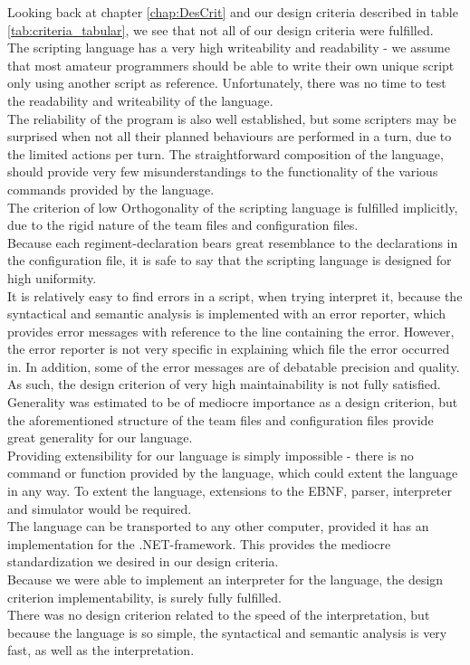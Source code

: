 	Looking back at chapter \ref{chap:DesCrit} and our design criteria described in table \ref{tab:criteria_tabular}, we see that not all of our design criteria were fulfilled. \\
	The scripting language has a very high writeability and readability - we assume that most amateur programmers should be able to write their own unique script only using another script as reference. Unfortunately, there was no time to test the readability and writeability of the language. \\
	The reliability of the program is also well established, but some scripters may be surprised when not all their planned behaviours are performed in a turn, due to the limited actions per turn. The straightforward composition of the language, should provide very few misunderstandings to the functionality of the various commands provided by the language.\\
	The criterion of low Orthogonality of the scripting language is fulfilled implicitly, due to the rigid nature of the team files and configuration files.\\ 
	Because each regiment-declaration bears great resemblance to the declarations in the configuration file, it is safe to say that the scripting language is designed for high uniformity. \\
	It is relatively easy to find errors in a script, when trying interpret it, because the syntactical and semantic analysis is implemented with an error reporter, which provides error messages with reference to the line containing the error. However, the error reporter is not very specific in explaining which file the error occurred in. In addition, some of the error messages are of debatable precision and quality. As such, the design criterion of very high maintainability is not fully satisfied.\\
	Generality was estimated to be of mediocre importance as a design criterion, but the aforementioned structure of the team files and configuration files provide great generality for our language.\\
	Providing extensibility for our language is simply impossible - there is no command or function provided by the language, which could extent the language in any way. To extent the language, extensions to the EBNF, parser, interpreter and simulator would be required. \\
	The language can be transported to any other computer, provided it has an implementation for the .NET-framework. This provides the mediocre standardization we desired in our design criteria.\\
	Because we were able to implement an interpreter for the language, the design criterion implementability, is surely fully fulfilled.\\
	There was no design criterion related to the speed of the interpretation, but because the language is so simple, the syntactical and semantic analysis is very fast, as well as the interpretation. \\
	
